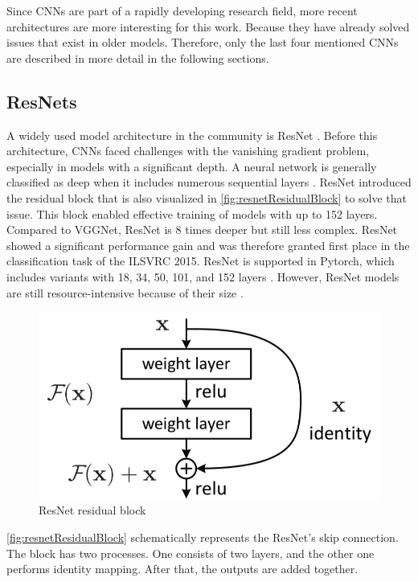 \vspace{0.5cm} %

\noindent Since \ac{CNN}s are part of a rapidly developing research field, more recent architectures are more interesting for this work.
Because they have already solved issues that exist in older models.
Therefore, only the last four mentioned \ac{CNN}s are described in more detail in the following sections.

\subsection{ResNets}

A widely used model architecture in the community is ResNet \cite{ResNet}.
Before this architecture, \ac{CNN}s faced challenges with the vanishing gradient problem, especially in models with a significant depth.
A neural network is generally classified as deep when it includes numerous sequential layers \cite{ResNet}.
ResNet introduced the residual block that is also visualized in \autoref{fig:resnetResidualBlock} to solve that issue.
This block enabled effective training of models with up to 152 layers. Compared to VGGNet, ResNet is 8 times deeper but still less complex.
ResNet showed a significant performance gain and was therefore granted first place in the classification task of the \ac{ILSVRC} 2015.
ResNet is supported in Pytorch, which includes variants with 18, 34, 50, 101, and 152 layers \cite{pytorchresnet}.
However, ResNet models are still resource-intensive because of their size \cite{networkArchitectureSurvey}. 

\begin{figure}[H]
    \centering
    \includegraphics[width=0.5\linewidth]{PICs/backbones/resnet_residualBlock.jpg}
    \caption{ResNet residual block \cite{ResNet}}
    \label{fig:resnetResidualBlock}
\end{figure}

\noindent \autoref{fig:resnetResidualBlock} schematically represents the ResNet's skip connection.
The block has two processes.
One consists of two layers, and the other one performs identity mapping.
After that, the outputs are added together.

